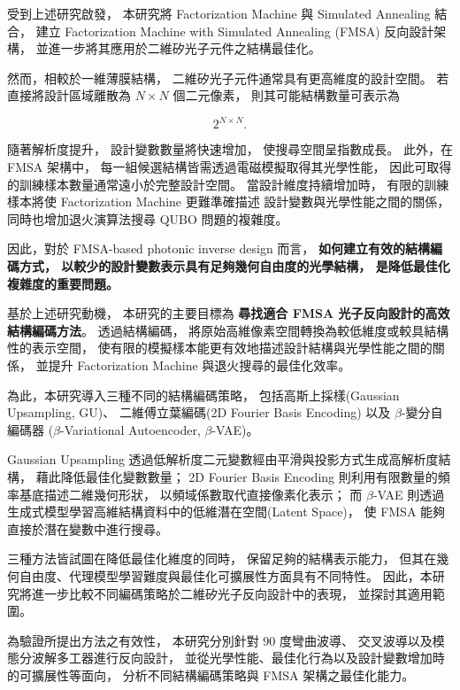 受到上述研究啟發，
本研究將 Factorization Machine 與 Simulated Annealing 結合，
建立 Factorization Machine with Simulated Annealing (FMSA) 反向設計架構，
並進一步將其應用於二維矽光子元件之結構最佳化。

然而，相較於一維薄膜結構，
二維矽光子元件通常具有更高維度的設計空間。
若直接將設計區域離散為 $N\times N$ 個二元像素，
則其可能結構數量可表示為

\begin{equation}
2^{N\times N}.
\end{equation}

隨著解析度提升，
設計變數數量將快速增加，
使搜尋空間呈指數成長。
此外，在 FMSA 架構中，
每一組候選結構皆需透過電磁模擬取得其光學性能，
因此可取得的訓練樣本數量通常遠小於完整設計空間。
當設計維度持續增加時，
有限的訓練樣本將使 Factorization Machine 更難準確描述
設計變數與光學性能之間的關係，
同時也增加退火演算法搜尋 QUBO 問題的複雜度。

因此，對於 FMSA-based photonic inverse design 而言，
\textbf{如何建立有效的結構編碼方式，
以較少的設計變數表示具有足夠幾何自由度的光學結構，
是降低最佳化複雜度的重要問題。}

基於上述研究動機，
本研究的主要目標為
\textbf{尋找適合 FMSA 光子反向設計的高效結構編碼方法}。
透過結構編碼，
將原始高維像素空間轉換為較低維度或較具結構性的表示空間，
使有限的模擬樣本能更有效地描述設計結構與光學性能之間的關係，
並提升 Factorization Machine 與退火搜尋的最佳化效率。

為此，本研究導入三種不同的結構編碼策略，
包括高斯上採樣(Gaussian Upsampling, GU)、
二維傅立葉編碼(2D Fourier Basis Encoding)
以及 $\beta$-變分自編碼器
($\beta$-Variational Autoencoder, $\beta$-VAE)。

Gaussian Upsampling 透過低解析度二元變數經由平滑與投影方式生成高解析度結構，
藉此降低最佳化變數數量；
2D Fourier Basis Encoding 則利用有限數量的頻率基底描述二維幾何形狀，
以頻域係數取代直接像素化表示；
而 $\beta$-VAE 則透過生成式模型學習高維結構資料中的低維潛在空間(Latent Space)，
使 FMSA 能夠直接於潛在變數中進行搜尋。

三種方法皆試圖在降低最佳化維度的同時，
保留足夠的結構表示能力，
但其在幾何自由度、代理模型學習難度與最佳化可擴展性方面具有不同特性。
因此，本研究將進一步比較不同編碼策略於二維矽光子反向設計中的表現，
並探討其適用範圍。

為驗證所提出方法之有效性，
本研究分別針對 90 度彎曲波導、
交叉波導以及模態分波解多工器進行反向設計，
並從光學性能、最佳化行為以及設計變數增加時的可擴展性等面向，
分析不同結構編碼策略與 FMSA 架構之最佳化能力。

